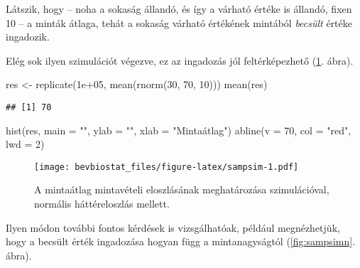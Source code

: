 \documentclass[
]{book}
\newenvironment{Shaded}{\begin{snugshade}}{\end{snugshade}}
\newcommand{\AttributeTok}[1]{\textcolor[rgb]{0.77,0.63,0.00}{#1}}
\newcommand{\DecValTok}[1]{\textcolor[rgb]{0.00,0.00,0.81}{#1}}
\newcommand{\FloatTok}[1]{\textcolor[rgb]{0.00,0.00,0.81}{#1}}
\newcommand{\FunctionTok}[1]{\textcolor[rgb]{0.00,0.00,0.00}{#1}}
\newcommand{\NormalTok}[1]{#1}
\newcommand{\OtherTok}[1]{\textcolor[rgb]{0.56,0.35,0.01}{#1}}
\newcommand{\StringTok}[1]{\textcolor[rgb]{0.31,0.60,0.02}{#1}}
\begin{document}
Látszik, hogy -- noha a sokaság állandó, és így a várható értéke is állandó, fixen 10 -- a minták átlaga, tehát a sokaság várható értékének mintából \emph{becsült} értéke ingadozik.

Elég sok ilyen szimulációt végezve, ez az ingadozás jól feltérképezhető (\ref{fig:sampsim}. ábra).

\begin{Shaded}
\begin{Highlighting}[]
\NormalTok{res }\OtherTok{\textless{}{-}} \FunctionTok{replicate}\NormalTok{(}\FloatTok{1e+05}\NormalTok{, }\FunctionTok{mean}\NormalTok{(}\FunctionTok{rnorm}\NormalTok{(}\DecValTok{30}\NormalTok{, }\DecValTok{70}\NormalTok{, }\DecValTok{10}\NormalTok{)))}
\FunctionTok{mean}\NormalTok{(res)}
\end{Highlighting}
\end{Shaded}

\begin{verbatim}
## [1] 70
\end{verbatim}

\begin{Shaded}
\begin{Highlighting}[]
\FunctionTok{hist}\NormalTok{(res, }\AttributeTok{main =} \StringTok{""}\NormalTok{, }\AttributeTok{ylab =} \StringTok{""}\NormalTok{, }\AttributeTok{xlab =} \StringTok{"Mintaátlag"}\NormalTok{)}
\FunctionTok{abline}\NormalTok{(}\AttributeTok{v =} \DecValTok{70}\NormalTok{, }\AttributeTok{col =} \StringTok{"red"}\NormalTok{, }\AttributeTok{lwd =} \DecValTok{2}\NormalTok{)}
\end{Highlighting}
\end{Shaded}

\begin{figure}
\centering
\texttt{[image: bevbiostat\_files/figure-latex/sampsim-1.pdf]}
\caption{\label{fig:sampsim}A mintaátlag mintavételi eloszlásának meghatározása szimulációval, normális háttéreloszlás mellett.}
\end{figure}

Ilyen módon további fontos kérdések is vizsgálhatóak, például megnézhetjük, hogy a becsült érték ingadozása hogyan függ a mintanagyságtól (\ref{fig:sampsimn}. ábra).
\end{document}
